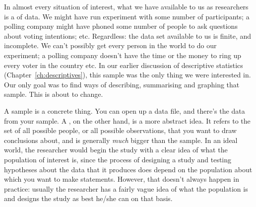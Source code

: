 In almost every situation of interest, what we have available to us as researchers is a  of data. We might have run experiment with some number of participants; a polling company might have phoned some number of people to ask questions about voting intentions; etc. Regardless: the data set available to us is finite, and incomplete. We can't possibly get every person in the  world to do our experiment; a polling company doesn't have the time or the money to ring up every voter in the country etc. In our earlier discussion of descriptive statistics (Chapter~\ref{ch:descriptives}), this sample was the only thing we were interested in. Our only goal was to find ways of describing, summarising and graphing that sample. This is about to change.


A sample is a concrete thing. You can open up a data file, and there's the data from your sample. A , on the other hand, is a more abstract idea. It refers to the set of all possible people, or all possible observations, that you want to draw conclusions about, and is generally {\it much} bigger than the sample. In an ideal world, the researcher would begin the study with a clear idea of what the population of interest is, since the process of designing a study and testing hypotheses about the data that it produces does depend on the population about which you want to make statements. However, that doesn't always happen in practice: usually the researcher has a fairly vague idea of what the population is and designs the study as best he/she can on that basis. 

